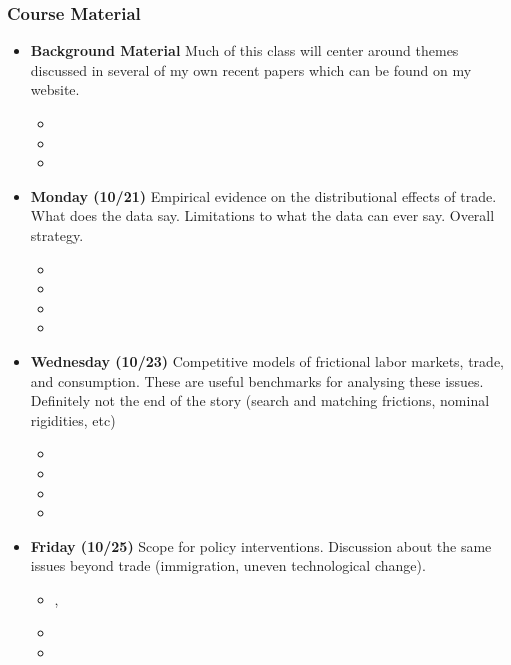 \documentclass[12pt,pdftex,twoside,letterpaper]{exam}
\begin{document}
\subsubsection*{Course Material}
\begin{itemize}
\item \textbf{Background Material} Much of this class will center around themes discussed in several of my own recent papers which can be found on my website. 
\begin{itemize}
\item {} 

\item {}

\item {}
\end{itemize}

\item \textbf{Monday (10/21)} Empirical evidence on the distributional effects of trade. What does the data say. Limitations to what the data can ever say. Overall strategy. 
\begin{itemize}
\item {}

\item {}

\item {}

\item {}
\end{itemize}

\item \textbf{Wednesday (10/23)} Competitive models of frictional labor markets, trade, and consumption. These are useful benchmarks for analysing these issues. Definitely not the end of the story (search and matching frictions, nominal rigidities, etc) 
\begin{itemize}
\item {}

\item {}

\item {}

\item {}
\end{itemize}

\item \textbf{Friday (10/25)} Scope for policy interventions. Discussion about the same issues beyond trade (immigration, uneven technological change).

\begin{itemize}
\item {},

\item {}

\item {}
\end{itemize}

\end{itemize}
\end{document}
